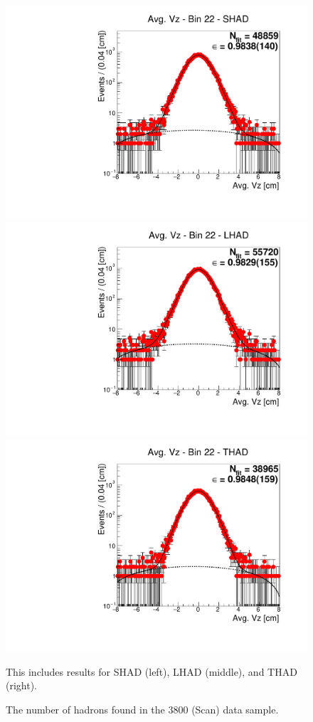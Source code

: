 \begin{figure}[H]
\centering
\includegraphics[scale=0.25]{figures/plots/nonDDbar_fit_results/scan/fit_scan_22_data_SHAD.pdf}
\hspace{-0.5cm}
\includegraphics[scale=0.25]{figures/plots/nonDDbar_fit_results/scan/fit_scan_22_data_LHAD.pdf}
\hspace{-0.5cm}
\includegraphics[scale=0.25]{figures/plots/nonDDbar_fit_results/scan/fit_scan_22_data_THAD.pdf}
\caption{The number of hadrons found in the 3800 (Scan) data sample.}
{This includes results for SHAD (left), LHAD (middle), and THAD (right).}
\label{fig:hadron_fits_scan_22}
\end{figure}


